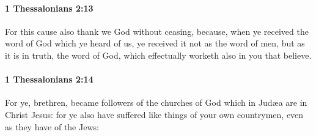 		\paragraph{1 Thessalonians 2:13} %
			\label{1THESSALONIANS-2-13}

			For this cause also thank we God without ceasing, because, when ye received the word of God which ye heard of us, ye received it not as the word of men, but as it is in truth, the word of God, which effectually worketh also in you that believe.

			\begin{framed}
			\scriptsize
				\begin{compactdesc}
					\item[SBLG] 
				\end{compactdesc}
			\end{framed}

		\paragraph{1 Thessalonians 2:14} %
			\label{1THESSALONIANS-2-14}

			For ye, brethren, became followers of the churches of God which in Judæa are in Christ Jesus: for ye also have suffered like things of your own countrymen, even as they have of the Jews:


